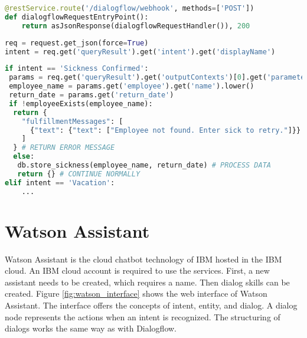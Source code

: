 \begin{lstlisting}[caption={Dialogflow Webhook Entry Point}, label={lst:dialogflow_entry_point},captionpos=b,frame=single,language={Python},commentstyle=\color{mygreen},keywordstyle=\color{blue},
    morekeywords={}]                
@restService.route('/dialogflow/webhook', methods=['POST'])
def dialogflowRequestEntryPoint():
    return asJsonResponse(dialogflowRequestHandler()), 200
\end{lstlisting}  

\begin{lstlisting}[caption={Dialogflow Request Parameters}, label={lst:dialogflow_request_params},captionpos=b,frame=single,language={Python},commentstyle=\color{mygreen},keywordstyle=\color{blue},
    morekeywords={}]                
req = request.get_json(force=True)
intent = req.get('queryResult').get('intent').get('displayName')
\end{lstlisting}  

\begin{lstlisting}[caption={Dialogflow Intent Handling}, label={lst:dialogflow_intent_handling},captionpos=b,frame=single,language={Python},commentstyle=\color{mygreen},keywordstyle=\color{blue},
    morekeywords={}]                
if intent == 'Sickness Confirmed':
 params = req.get('queryResult').get('outputContexts')[0].get('parameters')
 employee_name = params.get('employee').get('name').lower()
 return_date = params.get('return_date')
 if !employeeExists(employee_name):
  return {
    "fulfillmentMessages": [
      {"text": {"text": ["Employee not found. Enter sick to retry."]}}
    ]
  } # RETURN ERROR MESSAGE
  else:
   db.store_sickness(employee_name, return_date) # PROCESS DATA
   return {} # CONTINUE NORMALLY
elif intent == 'Vacation':
    ...
\end{lstlisting}  

\section{Watson Assistant}
Watson Assistant\citet{watsonassistant} is the cloud chatbot technology of IBM hosted in the IBM cloud.
An IBM cloud account is required to use the services.
First, a new assistant needs to be created, which requires a name.
Then dialog skills can be created.
Figure \ref{fig:watson_interface} shows the web interface of Watson Assistant.
The interface offers the concepts of intent, entity, and dialog.
A dialog node represents the actions when an intent is recognized.
The structuring of dialogs works the same way as with Dialogflow.

